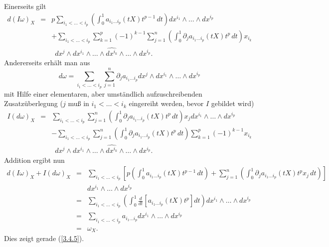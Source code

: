 \documentclass[a4paper,twoside,DIV15,BCOR12mm]{scrbook}
\begin{document}
\noindent
Einerseits gilt
\begin{eqnarray*}
d(I\omega)_{X} & = & p \sum_{i_{1} < \dots < i_{p}} 
\left(\int_{0}^{1} a_{i_{1} \dots i_{p}} (tX) t^{p-1} \, dt \right) 
dx^{i_{1}} \wedge \dots \wedge dx^{i_p} \\
&   & + \sum_{i_{1} < \dots < i_{p}} \sum_{k=1}^{p} (-1)^{k-1} 
\sum_{j=1}^{n} \left(\int_{0}^{1} \partial_{j} a_{i_{1} \dots i_{p}} 
(tX) t^{p}\, dt \right) x_{i_k} \\
&   & \enspace dx^{j} \wedge dx^{i_1} \wedge \dots \wedge 
\widehat{dx^{i_k}} \wedge \dots \wedge dx^{i_p}.
\end{eqnarray*}
Andererseits erhält man aus
\[ d\omega = \sum_{i_{1} < \dots < i_{p}} \sum_{j=1}^{n} \partial_{j} 
a_{i_{1} \dots i_{p}} dx^{j} \wedge dx^{i_1} \wedge \dots \wedge 
dx^{i_p} \]
mit Hilfe einer elementaren, aber umständlich aufzuschreibenden 
Zusatzüberlegung ($j$ muß in $i_{1} < \dots < i_{k}$ eingereiht 
werden, bevor $I$ gebildet wird)
\begin{eqnarray*}
I(d\omega)_{X} & = & \sum_{i_{1} < \dots < i_{p}} \sum_{j=1}^{n} 
\left(\int_{0}^{1} \partial_{j} a_{i_{1} \dots i_{p}} (tX) t^{p}\, dt 
\right) x_{j} dx^{i_1} \wedge \dots \wedge dx^{i_p} \\
&   & - \sum_{i_{1} < \dots < i_{p}} \sum_{j=1}^{n} 
\left(\int_{0}^{1} \partial_{j} a_{i_{1} \dots i_{p}} (tX) t^{p}\, 
dt \right) \sum_{k=1}^{p} (-1)^{k-1} x_{i_k} \\
&   & \enspace dx^{j} \wedge dx^{i_1} \wedge \dots \wedge 
\widehat{dx^{i_k}} \wedge \dots \wedge dx^{i_p}.
\end{eqnarray*}
Addition ergibt nun
\begin{eqnarray*} 
 d(I\omega)_{X} + I(d\omega)_{X} 
& = & \sum_{i_{1} < \dots < i_{p}} \left[ p \left(\int_{0}^{1} 
a_{i_{1} \dots i_{p}} (tX) t^{p-1}\, dt \right) + \sum_{j=1}^{n} 
\left( \int_{0}^{1} \partial_{j} a_{i_{1} \dots i_{p}} (tX) t^{p} 
x_{j}\, dt \right) \right] \\
&   & dx^{i_1} \wedge \dots \wedge dx^{i_p} \\
& = & \sum_{i_{1} < \dots < i_{p}} \left(\int_{0}^{1} \frac{d}{dt} 
\left[a_{i_{1} \dots i_{p}} (tX) t^{p}\right] dt \right) dx^{i_1} 
\wedge \dots \wedge dx^{i_p} \\
& = & \sum_{i_{1} < \dots < i_{p}} a_{i_{1} \dots i_{p}} dx^{i_1} 
\wedge \dots \wedge dx^{i_p} \\
& = & \omega_{X}.
\end{eqnarray*}
Dies zeigt gerade (\ref{3.4.5}). \\
\end{document}
